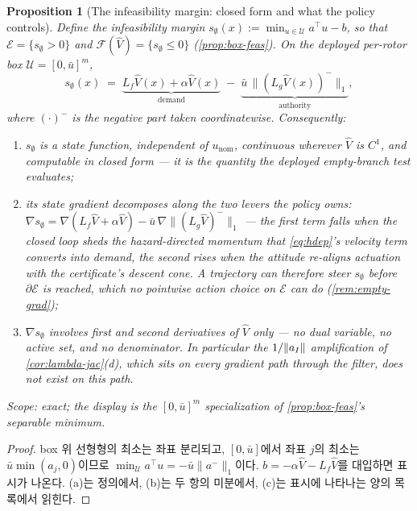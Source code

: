 \documentclass[11pt]{article}
\theoremstyle{plain}
\newtheorem{proposition}[theorem]{Proposition}
\theoremstyle{definition}
\theoremstyle{remark}
\DeclarePairedDelimiter{\norm}{\lVert}{\rVert}
\newcommand{\calU}{\mathcal{U}}
\newcommand{\Vhat}{\widehat V}
\newcommand{\Lg}{L_g}
\newcommand{\Lf}{L_f}
\newcommand{\bignormone}[1]{\lVert#1\rVert_1}
\newcommand{\eqdef}{:=}
\begin{document}
\begin{proposition}[The infeasibility margin: closed form and what the policy controls]\label{prop:sinfty-decomp}
Define the \emph{infeasibility margin}
$s_\emptyset(x)\eqdef\min_{u\in\calU}a^\top u-b$, so that
$\mathcal E=\{s_\emptyset>0\}$ and $\mathcal F(\Vhat)=\{s_\emptyset\le0\}$
(\cref{prop:box-feas}). On the deployed per-rotor box $\calU=[0,\bar u]^m$,
\[
  s_\emptyset(x)\;=\;\underbrace{\Lf\Vhat(x)+\alpha\Vhat(x)}_{\text{demand}}
  \;-\;\underbrace{\bar u\,\bignormone{(\Lg\Vhat(x))^-}}_{\text{authority}},
\]
where $(\cdot)^-$ is the negative part taken coordinatewise. Consequently:
\begin{enumerate}[label=(\alph*)]
  \item $s_\emptyset$ is a state function, independent of $u_{\mathrm{nom}}$, continuous
  wherever $\Vhat$ is $C^1$, and computable in closed form --- it is the quantity the deployed
  empty-branch test evaluates;
  \item its state gradient decomposes along the two levers the policy owns:
  $\nabla s_\emptyset=\nabla(\Lf\Vhat+\alpha\Vhat)-\bar u\,\nabla\bignormone{(\Lg\Vhat)^-}$
  --- the first term falls when the closed loop sheds the hazard-directed momentum that
  \cref{eq:hdep}'s velocity term converts into demand, the second rises when the attitude
  re-aligns actuation with the certificate's descent cone. A trajectory can therefore steer
  $s_\emptyset$ before $\partial\mathcal E$ is reached, which no pointwise action choice on
  $\mathcal E$ can do (\cref{rem:empty-grad});
  \item $\nabla s_\emptyset$ involves first and second derivatives of $\Vhat$ only --- no
  dual variable, no active set, and no denominator. In particular the
  $1/\norm{a_I}$ amplification of \cref{cor:lambda-jac}(d), which sits on every gradient path
  \emph{through} the filter, does not exist on this path.
\end{enumerate}
Scope: exact; the display is the $[0,\bar u]^m$ specialization of \cref{prop:box-feas}'s
separable minimum.
\end{proposition}
\begin{proof}
box 위 선형형의 최소는 좌표 분리되고, $[0,\bar u]$에서 좌표 $j$의 최소는
$\bar u\min(a_j,0)$이므로 $\min_\calU a^\top u=-\bar u\bignormone{a^-}$이다.
$b=-\alpha\Vhat-\Lf\Vhat$를 대입하면 표시가 나온다. (a)는 정의에서, (b)는 두 항의 미분에서,
(c)는 표시에 나타나는 양의 목록에서 읽힌다.
\end{proof}
\end{document}
